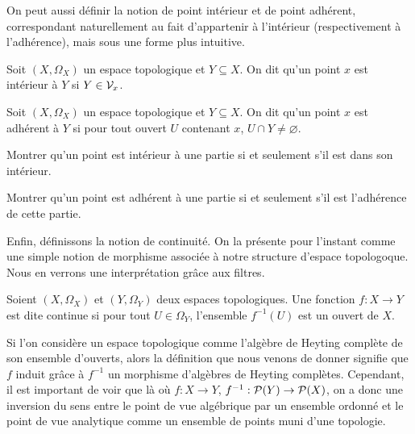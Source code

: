 On peut aussi définir la notion de point intérieur et de point adhérent,
correspondant naturellement au fait d'appartenir à l'intérieur (respectivement à
l'adhérence), mais sous une forme plus intuitive.

\begin{definition}
  Soit $(X,\Omega_X)$ un espace topologique et $Y\subseteq X$. On dit qu'un
  point $x$ est intérieur à $Y$ si $Y\in\mathcal{V}_x$.
\end{definition}

\begin{definition}
  Soit $(X,\Omega_X)$ un espace topologique et $Y\subseteq X$. On dit qu'un
  point $x$ est adhérent à $Y$ si pour tout ouvert $U$ contenant $x$,
  $U\cap Y\neq \varnothing$.
\end{definition}

\begin{exercise}
  Montrer qu'un point est intérieur à une partie si et seulement s'il est dans
  son intérieur.
\end{exercise}

\begin{exercise}\label{exo.carac.adhe}
  Montrer qu'un point est adhérent à une partie si et seulement s'il est
  l'adhérence de cette partie.
\end{exercise}

Enfin, définissons la notion de continuité. On la présente pour l'instant comme
une simple notion de morphisme associée à notre structure d'espace topologoque.
Nous en verrons une interprétation grâce aux filtres.

\begin{definition}
  Soient $(X,\Omega_X)$ et $(Y,\Omega_Y)$ deux espaces topologiques. Une
  fonction $f : X \to Y$ est dite continue si pour tout $U\in\Omega_Y$,
  l'ensemble $f^{-1}(U)$ est un ouvert de $X$.
\end{definition}

\begin{remark}
  Si l'on considère un espace topologique comme l'algèbre de Heyting complète de
  son ensemble d'ouverts, alors la définition que nous venons de donner signifie
  que $f$ induit grâce à $f^{-1}$ un morphisme d'algèbres de Heyting complètes.
  Cependant, il est important de voir que là où $f : X \to Y$,
  $f^{-1} : \mathcal{P}(Y)\to\mathcal{P}(X)$, on a donc une inversion du sens entre
  le point de vue algébrique par un ensemble ordonné et le point de vue
  analytique comme un ensemble de points muni d'une topologie.
\end{remark}

